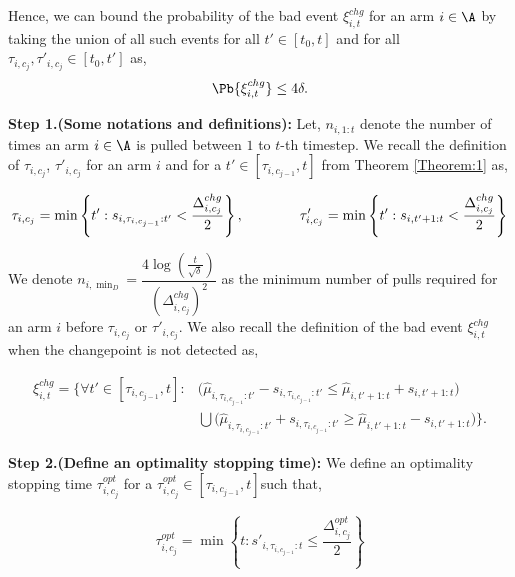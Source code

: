 \begin{customproof}{1}
Hence, we can bound the probability of the bad event $\xi^{chg}_{i,t}$ for an arm $i\in\A$ by taking the union of all such events for all $t'\in[t_0,t]$ and for all $\tau_{i,c_j},\tau'_{i,c_j}\in[t_0,t']$ as,
\begin{align*}
\Pb\lbrace \xi^{chg}_{i,t}\rbrace \leq 4\delta.
\end{align*}

\end{customproof}



\begin{customproof}{2}
\label{proof:Theorem:1}

\textbf{Step 1.(Some notations and definitions):} Let, $n_{i,1:t}$ denote the number of times an arm $i\in\A$ is pulled  between $1$ to $t$-th timestep. We recall the definition of $\tau_{i,c_j}$, $\tau'_{i,c_j}$ for an arm $i$ and for a $t'\in[\tau_{i,c_{j-1}}, t]$ from Theorem \ref{Theorem:1} as,

\begin{align*}
\tau_{i,c_j} = \min\left\lbrace t': s_{i,\tau_{i,c_{j-1}}:t'} < \dfrac{\Delta^{chg}_{i,c_j}}{2} \right\rbrace ,\hspace*{4em}
\tau'_{i,c_j} = \min\left\lbrace t': s_{i,t'+1:t} < \dfrac{\Delta^{chg}_{i,c_j}}{2} \right\rbrace
\end{align*}

We denote $n_{i,\min_{D}}= \dfrac{4\log(\frac{t}{\sqrt{\delta}})}{(\Delta^{chg}_{i,c_j})^2}$ as the minimum number of pulls required for an arm $i$ before $\tau_{i,c_j}$ or $\tau'_{i,c_j}$. We also recall the definition of the bad event $\xi^{chg}_{i,t}$ when the changepoint is not detected as,

\begin{align*}
\xi^{chg}_{i,t} = \bigg\lbrace\forall t'\in [\tau_{i,c_{j-1}} , t]:& \big(\hat{\mu}_{i,\tau_{i,c_{j-1}}:t'} - s_{i,\tau_{i,c_{j-1}}:t'} \leq \hat{\mu}_{i,t'+1:t} + s_{i,t'+1:t}\big) \\
&\bigcup \big(\hat{\mu}_{i,\tau_{i,c_{j-1}}:t'} +  s_{i,\tau_{i,c_{j-1}}:t'} \geq \hat{\mu}_{i,t'+1:t} - s_{i,t'+1:t}\big)\bigg\rbrace.
\end{align*}


\textbf{Step 2.(Define an optimality stopping time): } We define an optimality stopping time $\tau^{opt}_{i,c_j}$ for a $\tau^{opt}_{i,c_j}\in[\tau_{i,c_{j-1}},t]$such that,

\begin{align*}
\tau^{opt}_{i,c_j} = \min\left\lbrace t: s'_{i,\tau_{i,c_{j-1}}:t} \leq \dfrac{\Delta^{opt}_{i,c_j}}{2} \right\rbrace
\end{align*}


\end{customproof}

